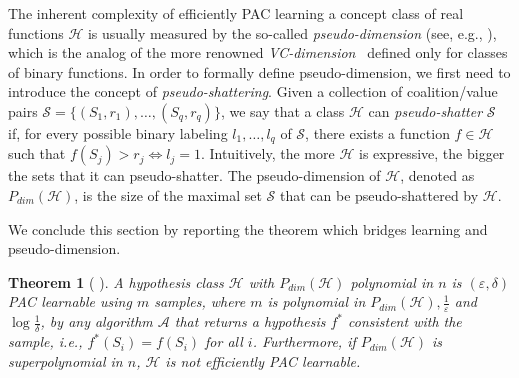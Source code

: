\documentclass[letterpaper]{article} %
\newtheorem{theorem}{Theorem}[section]
\newcommand{\hclass}{\ensuremath{\mathcal{H}}}
\newcommand{\sample}{\ensuremath{\mathcal{S}}}
\begin{document}
The inherent complexity of efficiently PAC learning a concept class of real functions $\hclass$ is usually measured by the so-called \emph{pseudo-dimension} (see, e.g., \citet{AnthonyBartlett}), which is the analog of the more renowned \emph{VC-dimension}~\cite{KearnsVazirani} defined only for classes of binary functions.
In order to formally define pseudo-dimension, we first need to introduce the concept of \emph{pseudo-shattering}. Given a collection of coalition/value pairs $\sample = \{(S_1, r_1), \ldots, (S_q, r_q)\}$, we say that a class $\hclass$ can \emph{pseudo-shatter} $\sample$ if, for every possible binary labeling $l_1,\ldots, l_q$ of $\sample$, there exists a function $f \in \hclass$ such that $f(S_j) > r_j \iff l_j=1$. Intuitively, the more $\hclass$ is expressive, the bigger the sets that it can pseudo-shatter. The pseudo-dimension of $\hclass$, denoted as $P_{dim}(\hclass)$, is the size of the maximal set $\sample$ that can be pseudo-shattered by $\hclass$.

We conclude this section by reporting the theorem which bridges learning and pseudo-dimension.
\begin{theorem}[\citeauthor{AnthonyBartlett} \citeyear{AnthonyBartlett}]\label{thm:PAC_learnability}
A hypothesis class $\mathcal{H}$ with $P_{dim}(\hclass)$ polynomial in $n$ is $(\varepsilon, \delta)$ PAC learnable using $m$ samples, where $m$ is polynomial in $P_{dim}(\mathcal{H}), \frac{1}{\varepsilon}$ and $\log \frac{1}{\delta}$, by any algorithm $\mathcal{A}$ that returns a hypothesis $f^*$ consistent with the sample, i.e., $f^*(S_i)=f(S_i)$ for all $i$.
Furthermore, if $P_{dim}(\mathcal{H})$ is superpolynomial in $n$, $\mathcal{H}$ is not efficiently PAC learnable.
\end{theorem}
\end{document}
